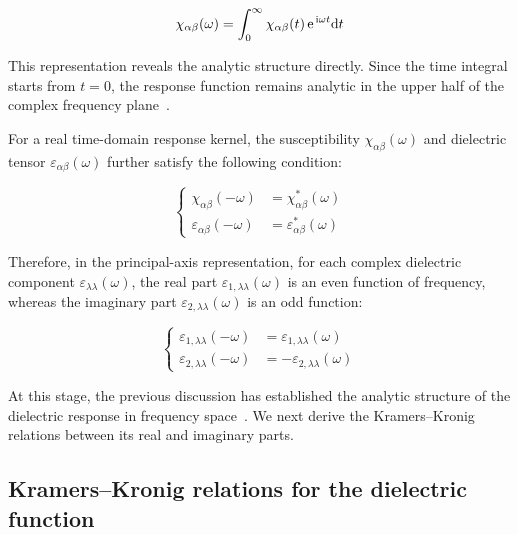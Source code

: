 \begin{equation}
\chi_{\alpha\beta}(\omega) =
    \int_{0}^{\infty}
    \chi_{\alpha\beta}(t)
    \,\mathrm{e}^{\,\mathrm{i}\omega t}
    \mathrm{d}{t}
\label{frequency_domain_susceptibility_from_causality}
\end{equation}

This representation reveals the analytic structure directly.
Since the time integral starts from $t=0$, the response function remains analytic in the upper half of the complex frequency plane~\cite{nussenzveig1972causality}.

For a real time-domain response kernel, the susceptibility $\chi_{\alpha\beta}(\omega)$
and dielectric tensor $\varepsilon_{\alpha\beta}(\omega)$ further satisfy the following condition:

\begin{equation}
\left\{\begin{aligned}
    \chi_{\alpha\beta}(-\omega)
    &= \chi_{\alpha\beta}^{*}(\omega) \\
    \varepsilon_{\alpha\beta}(-\omega)
    &= \varepsilon_{\alpha\beta}^{*}(\omega)
\end{aligned}\right.
\label{reality_condition_response_functions}
\end{equation}

Therefore, in the principal-axis representation,
for each complex dielectric component $\varepsilon_{\lambda\lambda}(\omega)$,
the real part $\varepsilon_{1,\lambda\lambda}(\omega)$ is an even function of frequency,
whereas the imaginary part $\varepsilon_{2,\lambda\lambda}(\omega)$ is an odd function:

\begin{equation}
\left\{\begin{aligned}
    \varepsilon_{1,\lambda\lambda}(-\omega)
    &= \varepsilon_{1,\lambda\lambda}(\omega) \\
    \varepsilon_{2,\lambda\lambda}(-\omega)
    &= -\varepsilon_{2,\lambda\lambda}(\omega)
\end{aligned}\right.
\label{parity_of_dielectric_components}
\end{equation}

At this stage, the previous discussion has established the analytic structure of the dielectric response in frequency space~\cite{nussenzveig1972causality,franta2020symmetry,leon2026momentum}.
We next derive the Kramers--Kronig relations between its real and imaginary parts.

\FloatBarrier
\subsection{Kramers--Kronig relations for the dielectric function}

